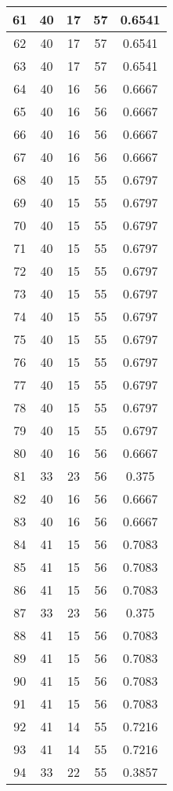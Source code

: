 \documentclass[letterpaper, 12pt]{article}
\begin{document}
\begin{longtable}{|c|c|c|c|c|}
\hline
61 & 40 & 17 & 57 & 0.6541 \\
\hline
62 & 40 & 17 & 57 & 0.6541 \\
\hline
63 & 40 & 17 & 57 & 0.6541 \\
\hline
64 & 40 & 16 & 56 & 0.6667 \\
\hline
65 & 40 & 16 & 56 & 0.6667 \\
\hline
66 & 40 & 16 & 56 & 0.6667 \\
\hline
67 & 40 & 16 & 56 & 0.6667 \\
\hline
68 & 40 & 15 & 55 & 0.6797 \\
\hline
69 & 40 & 15 & 55 & 0.6797 \\
\hline
70 & 40 & 15 & 55 & 0.6797 \\
\hline
71 & 40 & 15 & 55 & 0.6797 \\
\hline
72 & 40 & 15 & 55 & 0.6797 \\
\hline
73 & 40 & 15 & 55 & 0.6797 \\
\hline
74 & 40 & 15 & 55 & 0.6797 \\
\hline
75 & 40 & 15 & 55 & 0.6797 \\
\hline
76 & 40 & 15 & 55 & 0.6797 \\
\hline
77 & 40 & 15 & 55 & 0.6797 \\
\hline
78 & 40 & 15 & 55 & 0.6797 \\
\hline
79 & 40 & 15 & 55 & 0.6797 \\
\hline
80 & 40 & 16 & 56 & 0.6667 \\
\hline
81 & 33 & 23 & 56 & 0.375 \\
\hline
82 & 40 & 16 & 56 & 0.6667 \\
\hline
83 & 40 & 16 & 56 & 0.6667 \\
\hline
84 & 41 & 15 & 56 & 0.7083 \\
\hline
85 & 41 & 15 & 56 & 0.7083 \\
\hline
86 & 41 & 15 & 56 & 0.7083 \\
\hline
87 & 33 & 23 & 56 & 0.375 \\
\hline
88 & 41 & 15 & 56 & 0.7083 \\
\hline
89 & 41 & 15 & 56 & 0.7083 \\
\hline
90 & 41 & 15 & 56 & 0.7083 \\
\hline
91 & 41 & 15 & 56 & 0.7083 \\
\hline
92 & 41 & 14 & 55 & 0.7216 \\
\hline
93 & 41 & 14 & 55 & 0.7216 \\
\hline
94 & 33 & 22 & 55 & 0.3857 \\

\end{longtable}
\end{document}
